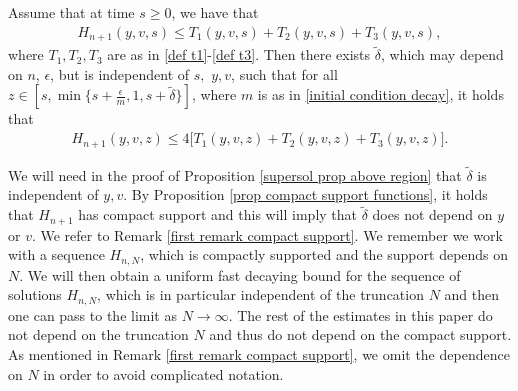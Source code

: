 \documentclass[11pt]{article}
\numberwithin{equation}{section}
\begin{document}
  \begin{prop}\label{continuity argument prop} Assume that at time $s\geq 0$, we have that
\begin{align}\label{initial condition continuity argument}
   H_{n+1}(y,v,s)\leq T_{1}(y,v,s)+T_{2}(y,v,s)+T_{3}(y,v,s),
\end{align}
where $T_{1},T_{2},T_{3}$ are as in \eqref{def t1}-\eqref{def t3}. Then there exists $\tilde{\delta}$, which may depend on $n$, $\epsilon$,  but is independent of $s,$ $y,v$, such that for all $z\in[s,\min\{s+\frac{\epsilon}{m},1,s+\tilde{\delta}\}]$, where $m$ is as in \eqref{initial condition decay}, it holds that
\begin{align}\label{continuity argument statement}
     H_{n+1}(y,v,z)\leq 4\big[ T_{1}(y,v,z)+ T_{2}(y,v,z)+ T_{3}(y,v,z)\big].
\end{align}
\end{prop}
\begin{rmk}\label{rmk compact support for delta uniform}  We will need in the proof of Proposition \ref{supersol prop above region} that $\tilde{\delta}$ is independent of $y, v$. By Proposition \ref{prop compact support functions}, it holds that $H_{n+1}$ has compact support and this will imply that $\tilde{\delta}$ does not depend on $y$ or $v$. We refer to Remark \ref{first remark compact support}. We remember we work with a sequence $H_{n,N}$, which is compactly supported and the support depends on $N$. We will then obtain a uniform  fast decaying bound for the sequence of solutions $H_{n,N}$, which is in particular independent of the truncation $N$ and then one can pass to the limit as $N \to \infty$. The rest of the estimates in this paper do not depend on the truncation $N$ and thus do not depend on the compact support. As mentioned in Remark \ref{first remark compact support}, we omit the dependence on $N$ in order to avoid complicated notation.
\end{rmk}
\end{document}
